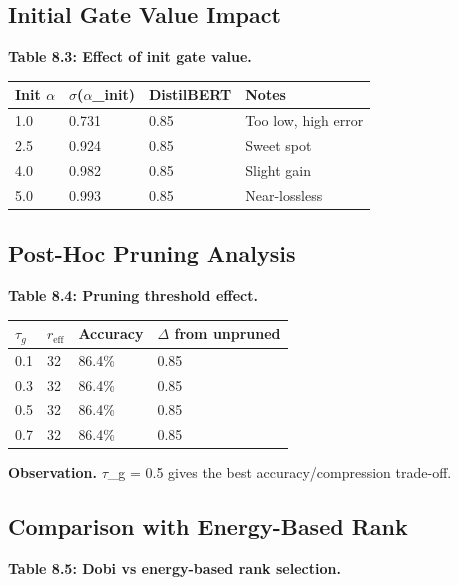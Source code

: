 \subsection{Initial Gate Value Impact}

\textbf{Table 8.3: Effect of init gate value.}

\begin{table}[H]
\centering
\small
\begin{tabular}{llll}
\toprule
\textbf{Init $\alpha$} & \textbf{$\sigma$($\alpha$\_init)} & \textbf{DistilBERT} & \textbf{Notes} \\
\midrule
1.0 & 0.731 & 0.85 & Too low, high error \\
2.5 & 0.924 & 0.85 & Sweet spot \\
4.0 & 0.982 & 0.85 & Slight gain \\
5.0 & 0.993 & 0.85 & Near-lossless \\
\bottomrule
\end{tabular}
\end{table}

\subsection{Post-Hoc Pruning Analysis}

\textbf{Table 8.4: Pruning threshold effect.}

\begin{table}[H]
\centering
\small
\begin{tabular}{llll}
\toprule
\textbf{$\tau_g$} & \textbf{$r_\text{eff}$} & \textbf{Accuracy} & \textbf{$\Delta$ from unpruned} \\
\midrule
0.1 & 32 & 86.4\% & 0.85 \\
0.3 & 32 & 86.4\% & 0.85 \\
0.5 & 32 & 86.4\% & 0.85 \\
0.7 & 32 & 86.4\% & 0.85 \\
\bottomrule
\end{tabular}
\end{table}

\textbf{Observation.} $\tau$\_g = 0.5 gives the best accuracy/compression trade-off.

\subsection{Comparison with Energy-Based Rank}

\textbf{Table 8.5: Dobi vs energy-based rank selection.}

